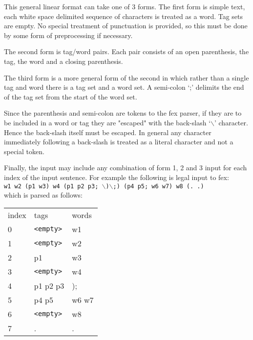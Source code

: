 \documentclass[11pt]{article}
\begin{document}
This general linear format can take one of 3 forms.  The first form is 
simple text, each white space delimited sequence of characters is treated 
as a word.  Tag sets are empty.  No special treatment of punctuation is 
provided, so this must be done by some form of preprocessing if necessary.

The second form is tag/word pairs.  Each pair consists of an open parenthesis,
the tag, the word and a closing parenthesis.  

The third form is a more general form of the second in which rather than 
a single tag and word there is a tag set and a word set.  A semi-colon `;' 
delimits the end of the tag set from the start of the word set.

Since the parenthesis and semi-colon are tokens to the fex parser, if they 
are to be included in a word or tag they are "escaped" with the back-slash 
`$\backslash$' character.  Hence the back-slash itself must be escaped.  In general 
any character immediately following a back-slash is treated as a literal 
character and not a special token.

Finally, the input may include any combination of form 1, 2 and 3 input for 
each index of the input sentence.  For example the following is legal input 
to fex:\\

{\tt w1 w2 (p1 w3) w4 (p1 p2 p3; $\backslash$)$\backslash$;) (p4 p5; w6 w7) w8 (. .)} \\

\noindent which is parsed as follows:

\begin{tabular}{lll}
index    &  tags      &  words \\
0           &{\tt<empty>}&  w1 \\
1                &{\tt<empty>}&  w2 \\
2                &  p1        &  w3 \\
3                &{\tt<empty>}&  w4 \\
4                &  p1 p2 p3  &  ); \\
5                &  p4 p5     &  w6 w7 \\
6                &{\tt<empty>}&  w8 \\
7           &  .                &  . \\
\end{tabular} 
\\ 
\end{document}
